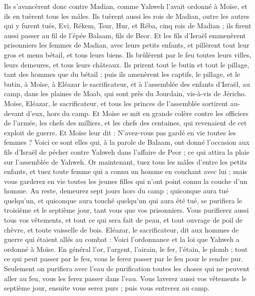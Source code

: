 \begin{multicols}{2}
Ils s'avancèrent donc contre Madian, comme Yahweh l'avait ordonné à Moïse, et ils en tuèrent tous les mâles.
Ils tuèrent aussi les rois de Madian, outre les autres qui y furent tués, Evi, Rékem, Tsur, Hur, et Réba, cinq rois de Madian ; ils firent aussi passer au fil de l'épée Balaam, fils de Beor.
Et les fils d'Israël emmenèrent prisonniers les femmes de Madian, avec leurs petits enfants, et pillèrent tout leur gros et menu bétail, et tous leurs biens.
Ils brûlèrent par le feu toutes leurs villes, leurs demeures, et tous leurs châteaux.
Ils prirent tout le butin et tout le pillage, tant des hommes que du bétail ;
puis ils amenèrent les captifs, le pillage, et le butin, à Moïse, à Eléazar le sacrificateur, et à l'assemblée des enfants d'Israël, au camp, dans les plaines de Moab, qui sont près du Jourdain, vis-à-vis de Jéricho.
Moïse, Eléazar, le sacrificateur, et tous les princes de l'assemblée sortirent au-devant d'eux, hors du camp.
Et Moïse se mit en grande colère contre les officiers de l'armée, les chefs des milliers, et les chefs des centaines, qui revenaient de cet exploit de guerre.
Et Moïse leur dit : N'avez-vous pas gardé en vie toutes les femmes ?
Voici ce sont elles qui, à la parole de Balaam, ont donné l'occasion aux fils d'Israël de pécher contre Yahweh dans l'affaire de Peor ; ce qui attira la plaie sur l'assemblée de Yahweh.
Or maintenant, tuez tous les mâles d'entre les petits enfants, et tuez toute femme qui a connu un homme en couchant avec lui ;
mais vous garderez en vie toutes les jeunes filles qui n'ont point connu la couche d'un homme.
Au reste, demeurez sept jours hors du camp ; quiconque aura tué quelqu'un, et quiconque aura touché quelqu'un qui aura été tué, se purifiera le troisième et le septième jour, tant vous que vos prisonniers.
Vous purifierez aussi tous vos vêtements, et tout ce qui sera fait de peau, et tout ouvrage de poil de chèvre, et toute vaisselle de bois.
Eléazar, le sacrificateur, dit aux hommes de guerre qui étaient allés au combat : Voici l'ordonnance et la loi que Yahweh a ordonné à Moïse.
En général l'or, l'argent, l'airain, le fer, l'étain, le plomb ;
tout ce qui peut passer par le feu, vous le ferez passer par le feu pour le rendre pur. Seulement on purifiera avec l'eau de purification toutes les choses qui ne peuvent aller au feu, vous les ferez passer dans l'eau.
Vous laverez aussi vos vêtements le septième jour, ensuite vous serez purs ; puis vous entrerez au camp.

\end{multicols}
